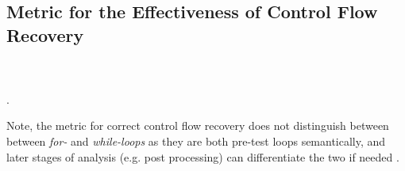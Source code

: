 
\subsection{Metric for the Effectiveness of Control Flow Recovery}
\label{sec:req_metric}

 \\
 \\
.

Note, the metric for correct control flow recovery does not distinguish between between \textit{for-} and \textit{while-loops} as they are both pre-test loops semantically, and later stages of analysis (e.g. post processing) can differentiate the two if needed \cite{no_more_gotos}.


